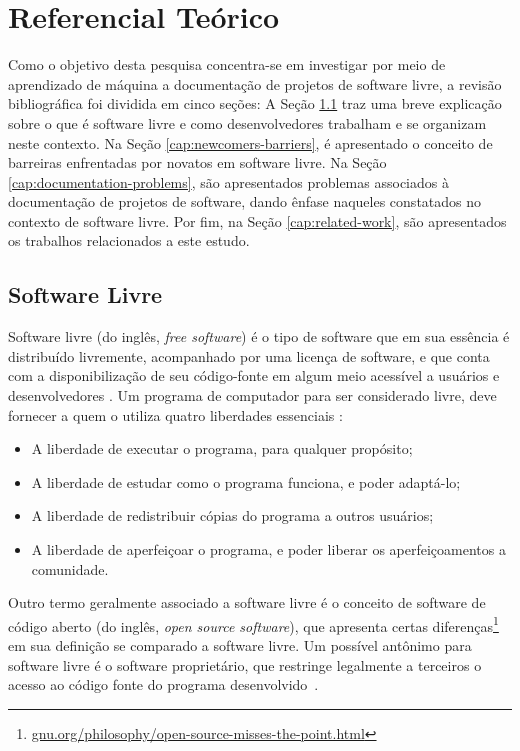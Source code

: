\chapter{Referencial Teórico}
\label{cap:literature-review}
Como o objetivo desta pesquisa concentra-se em investigar por meio de aprendizado de máquina a documentação de projetos de software livre, a revisão bibliográfica foi dividida em cinco seções: A Seção \ref{cap:free-software} traz uma breve explicação sobre o que é software livre e como desenvolvedores trabalham e se organizam neste contexto. Na Seção \ref{cap:newcomers-barriers}, é apresentado o conceito de barreiras enfrentadas por novatos em software livre. Na Seção \ref{cap:documentation-problems}, são apresentados problemas associados à documentação de projetos de software, dando ênfase naqueles constatados no contexto de software livre. Por fim, na Seção \ref{cap:related-work}, são apresentados os trabalhos relacionados a este estudo.


\section{Software Livre}

\label{cap:free-software}
Software livre (do inglês, \textit{free software}) é o tipo de software que em sua essência é distribuído livremente, acompanhado por uma licença de software, e que conta com a disponibilização de seu código-fonte em algum meio acessível a usuários e desenvolvedores \citep{Gacek:2004:MMO:968720.968793}. Um programa de computador para ser considerado livre, deve fornecer a quem o utiliza quatro liberdades essenciais \citep{stallman2002free}:
\begin{itemize}
    \item A liberdade de executar o programa, para qualquer propósito;
    \item A liberdade de estudar como o programa funciona, e poder adaptá-lo;
    \item A liberdade de redistribuir cópias do programa a outros usuários;
    \item A liberdade de aperfeiçoar o programa, e poder liberar os aperfeiçoamentos a comunidade.
\end{itemize}
Outro termo geralmente associado a software livre é o conceito de software de código aberto (do inglês, \textit{open source software}), que apresenta certas diferenças\footnote{\url{gnu.org/philosophy/open-source-misses-the-point.html}} em sua definição se comparado a software livre. Um possível antônimo para software livre é o software proprietário, que restringe legalmente a terceiros o acesso ao código fonte do programa desenvolvido~\citep{fuggetta2003open}.

